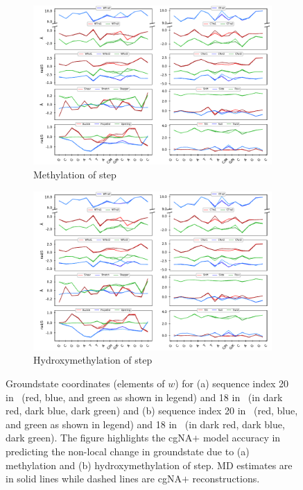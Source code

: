 \begin{figure}
  \begin{subfigure}{15cm}
    \centering\includegraphics[width=15cm]{images/compare_seq_MDNA_DNA_18.pdf}
    \caption{Methylation of \cpg step}
  \end{subfigure}
  \begin{subfigure}{15cm}
    \centering\includegraphics[width=15cm]{images/compare_seq_HDNA_DNA_18.pdf}
    \centering\caption{Hydroxymethylation of \cpg step}
  \end{subfigure}
\centering\caption{Groundstate coordinates (elements of $w$) for (a) sequence index 20  in \Lbdna \ (red, blue, and green as shown in legend) and 18 in \Lbm \ (in dark red, dark blue, dark green) and (b) sequence index 20 in \Lbdna \ (red, blue, and green as shown in legend) and 18 in \Lbh \ (in dark red, dark blue, dark green). The figure highlights the cgNA$+$ model accuracy in predicting the non-local change in groundstate due to (a) methylation and (b) hydroxymethylation of \cpg step. MD estimates are in solid lines while dashed lines are cgNA$+$ reconstructions.}
\label{c6:figure1}
\end{figure}

